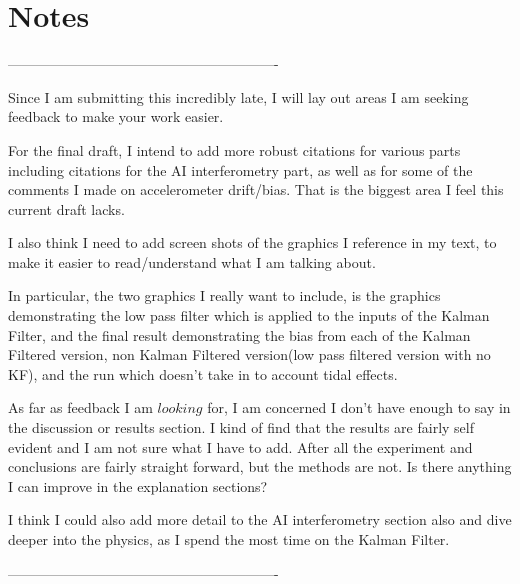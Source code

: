 \section{Notes}

----------------------------------------------------------


	Since I am submitting this incredibly late, I will lay out areas I am seeking feedback to make your work easier.
	
	
	For the final draft, I intend to add more robust citations for various parts including citations for the AI interferometry part, as well as for some of the comments I made on accelerometer drift/bias. That is the biggest area I feel this current draft lacks.
	
	I also think I need to add screen shots of the graphics I reference in my text, to make it easier to read/understand what I am talking about.
	
	In particular, the two graphics I really want to include, is the graphics demonstrating the low pass filter which is applied to the inputs of the Kalman Filter, and the final result demonstrating the bias from each of the Kalman Filtered version, non Kalman Filtered version(low pass filtered version with no KF), and the run which doesn't take in to account tidal effects.
	
	As far as feedback I am $looking$ for, I am concerned I don't have enough to say in the discussion or results section. I kind of find that the results are fairly self evident and I am not sure what I have to add. After all the experiment and conclusions are fairly straight forward, but the methods are not. Is there anything I can improve in the explanation sections?
	
	I think I could also add more detail to the AI interferometry section also and dive deeper into the physics, as I spend the most time on the Kalman Filter.
	
	
	
----------------------------------------------------------